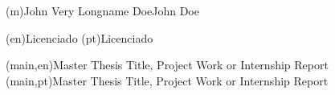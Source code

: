 
%



\ncauthorname(m){John Very Longname Doe}{John Doe}


\ncauthordegree(en){Licenciado} 
\ncauthordegree(pt){Licenciado}




\nctitle(main,en){Master Thesis Title, Project Work or Internship Report}%
\nctitle(main,pt){Master Thesis Title, Project Work or Internship Report}%

